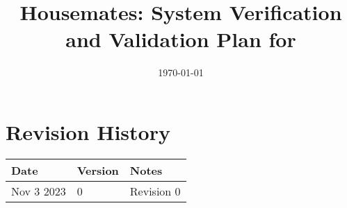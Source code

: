 \documentclass[12pt, titlepage]{article}
\begin{document}
\title{Housemates: System Verification and Validation Plan for \progname{}} 
\author{\authname}
\date{\today}
	
\maketitle


\section*{Revision History}

\begin{tabularx}{\textwidth}{p{3cm}p{2cm}X}
\toprule {\bf Date} & {\bf Version} & {\bf Notes}\\
\midrule
Nov 3 2023 & 0 & Revision 0\\
\bottomrule
\end{tabularx}



\newpage

\tableofcontents



\newpage

\end{document}
